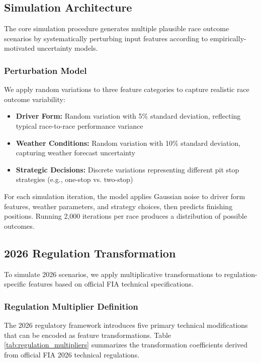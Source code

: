 \documentclass[conference]{IEEEtran}
\begin{document}
\subsection{Simulation Architecture}

The core simulation procedure generates multiple plausible race outcome scenarios by systematically perturbing input features according to empirically-motivated uncertainty models.

\subsubsection{Perturbation Model}

We apply random variations to three feature categories to capture realistic race outcome variability:

\begin{itemize}
    \item \textbf{Driver Form:} Random variation with 5\% standard deviation, reflecting typical race-to-race performance variance
    \item \textbf{Weather Conditions:} Random variation with 10\% standard deviation, capturing weather forecast uncertainty
    \item \textbf{Strategic Decisions:} Discrete variations representing different pit stop strategies (e.g., one-stop vs. two-stop)
\end{itemize}

For each simulation iteration, the model applies Gaussian noise to driver form features, weather parameters, and strategy choices, then predicts finishing positions. Running 2,000 iterations per race produces a distribution of possible outcomes.

\subsection{2026 Regulation Transformation}

To simulate 2026 scenarios, we apply multiplicative transformations to regulation-specific features based on official FIA technical specifications.

\subsubsection{Regulation Multiplier Definition}

The 2026 regulatory framework introduces five primary technical modifications that can be encoded as feature transformations. Table \ref{tab:regulation_multipliers} summarizes the transformation coefficients derived from official FIA 2026 technical regulations.
\end{document}
